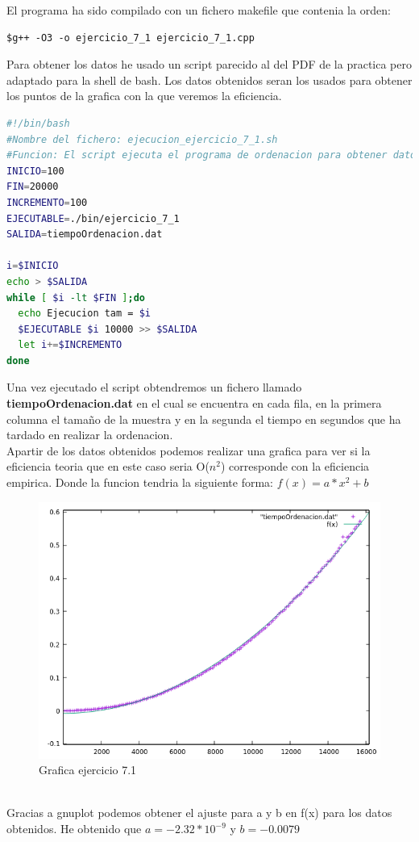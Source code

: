 \documentclass[12pt,a4psprt]{article}
\begin{document}
El programa ha sido compilado con un fichero makefile que contenia la orden:
\begin{verbatim}
$g++ -O3 -o ejercicio_7_1 ejercicio_7_1.cpp
\end{verbatim}
Para obtener los datos he usado un script parecido al del PDF de la practica pero adaptado para la shell de bash. Los datos obtenidos seran los usados para obtener los puntos de la grafica con la que veremos la eficiencia.
\begin{lstlisting}[language=bash]
#!/bin/bash
#Nombre del fichero: ejecucion_ejercicio_7_1.sh
#Funcion: El script ejecuta el programa de ordenacion para obtener datos de eficiencia
INICIO=100
FIN=20000
INCREMENTO=100
EJECUTABLE=./bin/ejercicio_7_1
SALIDA=tiempoOrdenacion.dat

i=$INICIO
echo > $SALIDA
while [ $i -lt $FIN ];do
  echo Ejecucion tam = $i
  $EJECUTABLE $i 10000 >> $SALIDA
  let i+=$INCREMENTO
done

\end{lstlisting}

Una vez ejecutado el script obtendremos un fichero llamado \textbf{tiempoOrdenacion.dat} en el cual se encuentra en cada fila, en la primera columna el tamaño de la muestra y en la segunda el tiempo en segundos que ha tardado en realizar la ordenacion.
\pagebreak
\\
Apartir de los datos obtenidos  podemos realizar una grafica para ver si la eficiencia teoria que en este caso seria O($n^{2}$) corresponde con la eficiencia empirica. Donde la funcion tendria la siguiente forma: \textbf{$f(x)=a*x^{2}+b $}
\begin{figure}[h]
\begin{center}
	\includegraphics[scale=1]{image/grafica_7_1.png}
\end{center}
\caption{Grafica ejercicio 7.1}

\end{figure}
\\
Gracias a gnuplot podemos obtener el ajuste para a y b en f(x) para los datos obtenidos.
He obtenido que $a=-2.32*10^{-9}$ y $b=-0.0079$
\end{document}

